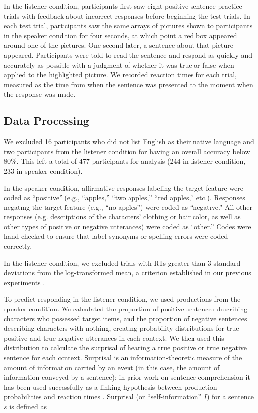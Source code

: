 \documentclass[man, floatsintext, noapacite]{apa6}
\begin{document}
In the listener condition, participants first saw eight positive sentence practice trials with feedback about incorrect responses before beginning the test trials. In each test trial, participants saw the same arrays of pictures shown to participants in the speaker condition for four seconds, at which point a red box appeared around one of the pictures.  One second later, a sentence about that picture appeared.  Participants were told to read the sentence and respond as quickly and accurately as possible with a judgment of whether it was true or false when applied to the highlighted picture.  We recorded reaction times for each trial, measured as the time from when the sentence was presented to the moment when the response was made.
  
\subsection{Data Processing} 
  
We excluded 16 participants who did not list English as their native language and two participants from the listener condition for having an overall accuracy below 80\%. This left a total of 477 participants for analysis (244 in listener condition, 233 in speaker condition). 

In the speaker condition, affirmative responses labeling the target feature were coded as ``positive'' (e.g., ``apples,'' ``two apples,'' ``red apples,'' etc.).  Responses negating the target feature (e.g., ``no apples'') were coded as ``negative.''  All other responses (e.g. descriptions of the characters' clothing or hair color, as well as other types of positive or negative utterances) were coded as ``other.''   Codes were hand-checked to ensure that label synonyms or spelling errors were coded correctly.

In the listener condition, we excluded trials with RTs greater than 3 standard deviations from the log-transformed mean, a criterion established in our previous experiments \cite{nordmeyer2014}.  

To predict responding in the listener condition, we used productions from the speaker condition. We calculated the proportion of positive sentences describing characters who possessed target items, and the proportion of negative sentences describing characters with nothing, creating probability distributions for true positive and true negative utterances in each context.  We then used this distribution to calculate the surprisal of hearing a true positive or true negative sentence for each context. Surprisal is an information-theoretic measure of the amount of information carried by an event (in this case, the amount of information conveyed by a sentence); in prior work on sentence comprehension it has been used successfully as a linking hypothesis between production probabilities and reaction times \cite{levy2008}. Surprisal (or ``self-information'' $I$) for a sentence $s$ is defined as
\end{document}
